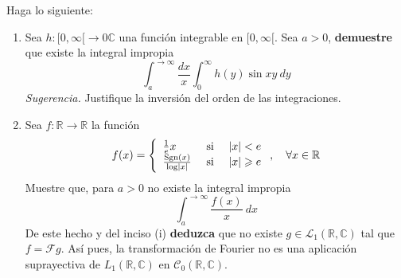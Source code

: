 \documentclass[12pt]{report}
\theoremstyle{largebreak}
\renewcommand{\geq}{\ensuremath{\geqslant}}
\newcommand\abs[1]{\ensuremath{\left|#1\right|}}
\newcommand\cf[3]{\ensuremath{#1:#2\rightarrow#3}}
\newcommand{\fou}[1]{\ensuremath{\mathcal{F}#1}}
\begin{document}
    \begin{excer}
        Haga lo siguiente:
        \begin{enumerate}
            \item Sea $\cf{h}{[0,\infty[}{0\mathbb{C}}$ una función integrable en $[0,\infty[$. Sea $a>0$, \textbf{demuestre} que existe la integral impropia
            \begin{equation*}
                \int_{a}^{ \rightarrow\infty}\frac{dx}{x}\int_0^{\infty}h(y)\sin xy\:dy
            \end{equation*}
            \textit{Sugerencia.} Justifique la inversión del orden de las integraciones.
            \item Sea $\cf{f}{\mathbb{R}}{\mathbb{R}}$ la función
            \begin{equation*}
                f(x)=\left\{
                    \begin{array}{lcr}
                        \frac{1}{e}x & \textup{ si } & \abs{x}<e\\
                        \frac{\Sgn{x}}{\log\abs{x}} & \textup{ si } & \abs{x}\geq e\\
                    \end{array}
                \right.,\quad\forall x\in\mathbb{R}
            \end{equation*}
            Muestre que, para $a>0$ no existe la integral impropia
            \begin{equation*}
                \int_a^{\rightarrow \infty}\frac{f(x)}{x}\:dx
            \end{equation*}
            De este hecho y del inciso (i) \textbf{deduzca} que no existe $g\in\mathcal{L}_1(\mathbb{R},\mathbb{C})$ tal que $f=\fou{g}$. Así pues, la transformación de Fourier no es una aplicación suprayectiva de $L_1(\mathbb{R},\mathbb{C})$ en $\mathcal{C}_0(\mathbb{R},\mathbb{C})$.
        \end{enumerate}
    \end{excer}

    \begin{sol}
        
    \end{sol}
\end{document}
